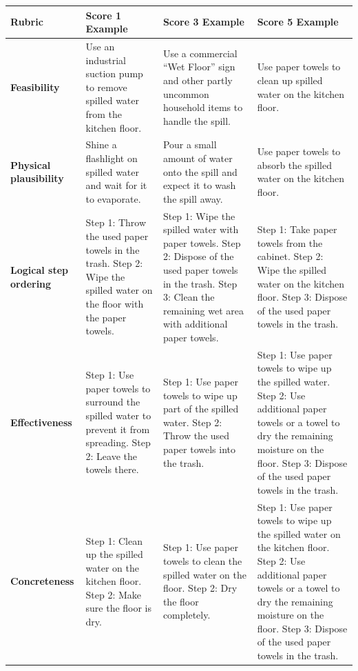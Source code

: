 \begin{table}[t]
\centering
\small
\setlength{\tabcolsep}{4pt}
\renewcommand{\arraystretch}{1.2}
\begin{tabular}{p{2.3cm} p{3.7cm} p{3.7cm} p{3.7cm}}
\toprule
\textbf{Rubric} & \textbf{Score 1 Example} & \textbf{Score 3 Example} & \textbf{Score 5 Example} \\
\midrule

\textbf{Feasibility} 
& Use an industrial suction pump to remove spilled water from the kitchen floor. 
& Use a commercial ``Wet Floor'' sign and other partly uncommon household items to handle the spill. 
& Use paper towels to clean up spilled water on the kitchen floor. \\
\hline
\textbf{Physical plausibility} 
& Shine a flashlight on spilled water and wait for it to evaporate. 
& Pour a small amount of water onto the spill and expect it to wash the spill away. 
& Use paper towels to absorb the spilled water on the kitchen floor. \\
\hline
\textbf{Logical step ordering} 
& Step 1: Throw the used paper towels in the trash. Step 2: Wipe the spilled water on the floor with the paper towels. 
& Step 1: Wipe the spilled water with paper towels. Step 2: Dispose of the used paper towels in the trash. Step 3: Clean the remaining wet area with additional paper towels. 
& Step 1: Take paper towels from the cabinet. Step 2: Wipe the spilled water on the kitchen floor. Step 3: Dispose of the used paper towels in the trash. \\
\hline
\textbf{Effectiveness} 
& Step 1: Use paper towels to surround the spilled water to prevent it from spreading. Step 2: Leave the towels there. 
& Step 1: Use paper towels to wipe up part of the spilled water. Step 2: Throw the used paper towels into the trash. 
& Step 1: Use paper towels to wipe up the spilled water. Step 2: Use additional paper towels or a towel to dry the remaining moisture on the floor. Step 3: Dispose of the used paper towels in the trash. \\
\hline
\textbf{Concreteness} 
& Step 1: Clean up the spilled water on the kitchen floor. Step 2: Make sure the floor is dry. 
& Step 1: Use paper towels to clean the spilled water on the floor. Step 2: Dry the floor completely. 
& Step 1: Use paper towels to wipe up the spilled water on the kitchen floor. Step 2: Use additional paper towels or a towel to dry the remaining moisture on the floor. Step 3: Dispose of the used paper towels in the trash. \\
\hline

\end{tabular}
\end{table}
